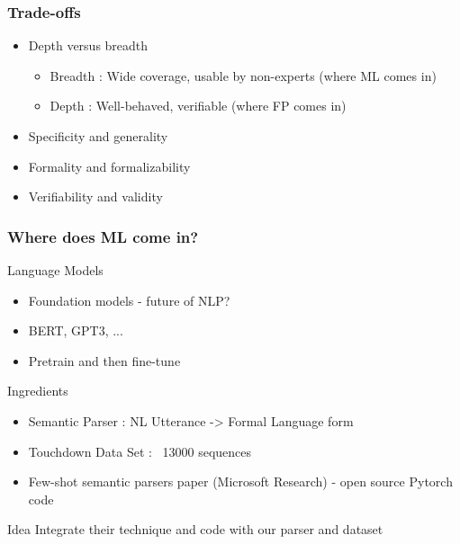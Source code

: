 \documentclass{beamer}
\begin{document}
\begin{frame}
\frametitle{Trade-offs}
\begin{itemize}[<+->]
\item Depth versus breadth
\begin{itemize}[<+->]
\item Breadth : Wide coverage, usable by non-experts (where ML comes in)
\item Depth   : Well-behaved, verifiable (where FP comes in)
\end{itemize}
\item Specificity and generality
\item Formality and formalizability
\item Verifiability and validity
\end{itemize}
\end{frame}


\begin{frame}
\frametitle{Where does ML come in?}

\begin{exampleblock}{Language Models}
\begin{itemize}
\item Foundation models - future of NLP?
\item BERT, GPT3, ...
\item Pretrain and then fine-tune
\end{itemize}
\end{exampleblock}

\begin{block}{Ingredients}
\begin{itemize}
\item Semantic Parser : NL Utterance -> Formal Language form
\item Touchdown Data Set : ~13000 sequences
\item Few-shot semantic parsers paper (Microsoft Research) - open source Pytorch code
\end{itemize}
\end{block}

\begin{alertblock}{Idea}
Integrate their technique and code with our parser and dataset
\end{alertblock}

\end{frame}
\end{document}
